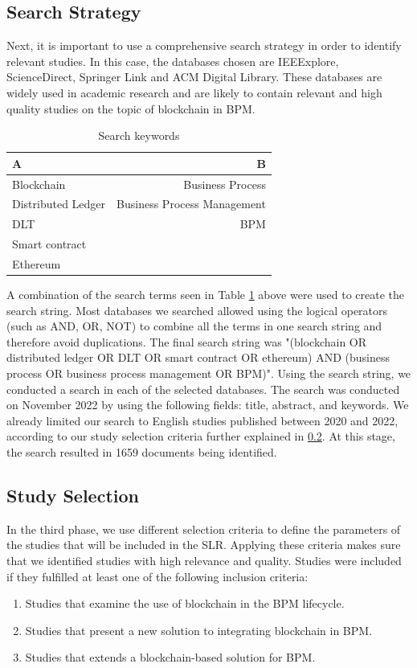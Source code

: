 \subsection{Search Strategy}
Next, it is important to use a comprehensive search strategy in order to identify relevant studies. In this case, the databases chosen are IEEExplore, ScienceDirect, Springer Link and ACM Digital Library. These databases are widely used in academic research and are likely to contain relevant and high quality studies on the topic of blockchain in BPM. 
\setlength{\tabcolsep}{3em}
\begin{table}[]
    \centering
    \caption{Search keywords}
    \begin{tabular}{l r}
        \hline
        A & B \\
        \hline\hline
        Blockchain & Business Process\\
        Distributed Ledger &  Business Process Management\\
        DLT & BPM \\
        Smart contract &  \\
        Ethereum & \\
        \hline
    \end{tabular}
    \label{tab:keywords}
\end{table}

A combination of the search terms seen in Table \ref{tab:keywords} above were used to create the search string. Most databases we searched allowed using the logical operators (such as AND, OR, NOT) to combine all the terms in one search string and therefore avoid duplications.  The final search string was "(blockchain OR distributed ledger OR DLT OR smart contract OR ethereum) AND (business process OR business process management OR BPM)". Using the search string, we conducted a search in each of the selected databases. The search was conducted on November 2022 by using the following fields: title, abstract, and keywords. We already limited our search to English studies published between 2020 and 2022, according to our study selection criteria further explained in \ref{ssec:study-selection}. At this stage, the search resulted in 1659 documents being identified.

\subsection{Study Selection} \label{ssec:study-selection}
In the third phase, we use different selection criteria to define the parameters of the studies that will be included in the SLR. Applying these criteria makes sure that we identified studies with high relevance and quality. Studies were included if they fulfilled at least one of the following inclusion criteria:
\begin{enumerate}
    \item Studies that examine the use of blockchain in the BPM lifecycle.
    \item Studies that present a new solution to integrating blockchain in BPM.
    \item Studies that extends a blockchain-based solution for BPM.
\end{enumerate}

